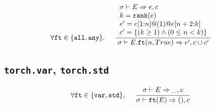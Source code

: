 \documentclass{article}
\begin{document}
\begin{align*}
  \forall \mathtt{ft} \in \{ \mathtt{all}, \mathtt{any} \},\,\,\,\,\,\,\,\,
  \frac
  {
    \begin{array}{l}
      \sigma \vdash E \Rightarrow e, c \\
      k = \mathtt{rank(}e\mathtt{)} \\
      e' = e \mathtt{[}1\mathtt{:}n\mathtt{]} \mathtt{@} (1) \mathtt{@} e \mathtt{[}n+2\mathtt{:}k\mathtt{]} \\
      c' = \{ (k \geq 1) \land (0 \leq n < k) \}
    \end{array}
  }
  {
    \sigma \vdash E.\mathtt{ft(}n, True\mathtt{)} \Rightarrow e', c \cup c'
  }
\end{align*}


\subsection*{\texttt{torch.var}, \texttt{torch.std}}
\begin{align*}
  \forall \mathtt{ft} \in \{\mathtt{var}, \mathtt{std}\},
  \,\,\,\,\,\,\,\,
  \frac
  {
    \begin{array}{l}
      \sigma \vdash E \Rightarrow \_, c
    \end{array}
  }
  {
    \sigma \vdash \mathtt{ft(}E\mathtt{)} \Rightarrow (), c
  }
\end{align*}
\end{document}

